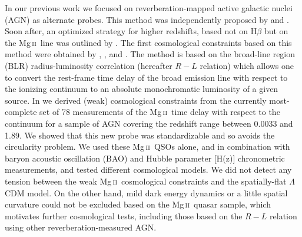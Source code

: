 \documentclass[a4paper,fleqn,usenatbib]{mnras}
\newcommand{\Mgii}{Mg\,\textsc{ii}}
\begin{document}
In our previous work  \citep{khadka2021} we focused on reverberation-mapped active galactic nuclei (AGN) as alternate probes. This method was independently proposed by \citet{haas2011} and  \citet{watson2011}. Soon after, an optimized strategy for higher redshifts, based not on H$\beta$ but on the \Mgii\ line was outlined by \citet{czerny2013}.  The first cosmological constraints based on this method were obtained by \citet{Mary2019}, \citet{Michal2021}, and \citet{Czerny2021}. The method is based on the broad-line region (BLR) radius-luminosity correlation (hereafter $R-L$ relation) which allows one to convert the rest-frame time delay of the broad emission line with respect to the ionizing continuum to an absolute monochromatic luminosity of a given source. In \citet{khadka2021} we derived (weak) cosmological constraints from the currently most-complete set of 78 measurements of the \Mgii\ time delay with respect to the continuum for a sample of AGN covering the redshift range between 0.0033 and 1.89. We showed that this new probe was standardizable and so avoids the circularity problem. We used these \Mgii\ QSOs alone, and in combination with baryon acoustic oscillation (BAO) and Hubble parameter [H(z)] chronometric measurements, and tested different cosmological models. We did not detect any tension between the weak \Mgii\ cosmological constraints and the spatially-flat $\Lambda$CDM model. On the other hand, mild dark energy dynamics or a little spatial curvature could not be excluded based on the \Mgii\ quasar sample, which motivates further cosmological tests, including those based on the $R-L$ relation using other reverberation-measured AGN.
\end{document}
